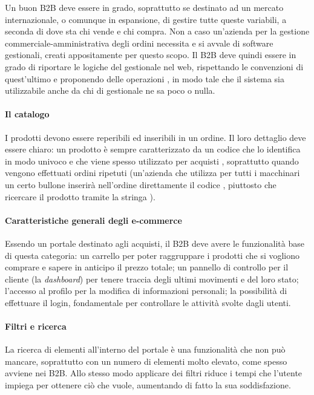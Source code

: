 Un buon B2B deve essere in grado, soprattutto se destinato ad un mercato internazionale, o comunque in espansione, di gestire tutte queste variabili, a seconda di dove sta chi vende e chi compra. Non a caso un'azienda per la gestione commerciale-amministrativa degli ordini necessita e si avvale di software gestionali, creati appositamente per questo scopo. Il B2B deve quindi essere in grado di riportare le logiche del gestionale nel web, rispettando le convenzioni di quest'ultimo e proponendo delle operazioni , in modo tale che il sistema sia utilizzabile anche da chi di gestionale ne sa poco o nulla.

\paragraph{Il catalogo}
I prodotti devono essere reperibili ed inseribili in un ordine. Il loro dettaglio deve essere chiaro: un prodotto è sempre caratterizzato da un codice che lo identifica in modo univoco e che viene spesso utilizzato per acquisti , soprattutto quando vengono effettuati ordini ripetuti (un'azienda che utilizza per tutti i macchinari un certo bullone inserirà nell'ordine direttamente il codice , piuttosto che ricercare il prodotto tramite la stringa ).

\paragraph{Caratteristiche generali degli e-commerce}
Essendo un portale destinato agli acquisti, il B2B deve avere le funzionalità base di questa categoria: un carrello per poter raggruppare i prodotti che si vogliono comprare e sapere in anticipo il prezzo totale; un pannello di controllo per il cliente (la \textit{dashboard}) per tenere traccia degli ultimi movimenti e del loro stato; l'accesso al profilo per la modifica di informazioni personali; la possibilità di effettuare il login, fondamentale per controllare le attività svolte dagli utenti.

\paragraph{Filtri e ricerca}
La ricerca di elementi all'interno del portale è una funzionalità che non può mancare, soprattutto con un numero di elementi molto elevato, come spesso avviene nei B2B. Allo stesso modo applicare dei filtri riduce i tempi che l'utente impiega per ottenere ciò che vuole, aumentando di fatto la sua soddisfazione.

